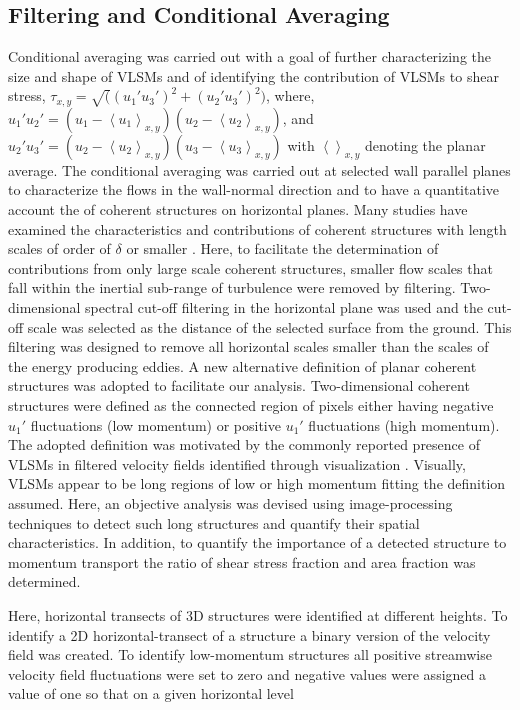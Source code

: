 \documentclass{svjour3}                     %
\begin{document}
\subsection{Filtering and Conditional Averaging}
Conditional averaging was carried out with a goal of further characterizing the size and shape of VLSMs and of identifying the contribution of VLSMs to shear stress, $\tau_{x,y} = \sqrt((u_{1}'u_{3}')^2+(u_{2}'u_{3}')^2)$, where, $u_{1}'u_{2}'= (u_{1} -\left< u_{1}\right >_{x,y})(u_{2} -\left< u_{2}\right >_{x,y})$, and $u_{2}'u_{3}'= (u_2 -\left< u_{2}\right >_{x,y})(u_{3} -\left< u_{3}\right >_{x,y})$ with $\left < \right >_{x,y}$ denoting the planar average. The conditional averaging was carried out at selected wall parallel planes to characterize the flows in the wall-normal direction and to have a quantitative account the of coherent structures on horizontal planes. Many studies have examined  the characteristics and contributions of coherent structures with length scales of order of $\delta$ or smaller \citep{}. Here, to facilitate the determination of contributions from only large scale coherent structures, smaller flow scales that  fall within the inertial sub-range of turbulence were removed by filtering.  Two-dimensional spectral cut-off filtering in the horizontal plane was used and the cut-off scale was selected as the distance of the selected surface from the ground. This filtering was designed to remove all horizontal scales smaller than the scales  of the energy producing eddies.  A new alternative definition of planar coherent structures was adopted to facilitate our analysis. Two-dimensional coherent structures were defined as the connected region of pixels either having negative $u_{1}'$ fluctuations (low momentum) or positive $u_{1}'$ fluctuations (high momentum). The adopted definition was motivated by the commonly reported presence of VLSMs in filtered velocity fields identified through visualization \citep{hutchins_marusic_jfm2007,dennis_nickels_jfm2011}.  Visually, VLSMs appear to be long regions of low or high momentum fitting the definition assumed.  Here, an objective analysis was devised using image-processing techniques to detect such long structures and quantify their spatial characteristics. In addition, to quantify the importance of a detected structure to momentum transport the ratio of shear stress fraction and area fraction was determined.  

Here, horizontal transects of 3D structures were identified at different heights. To identify a 2D horizontal-transect of a structure a binary version of the velocity field was created. To identify low-momentum structures all positive streamwise velocity field fluctuations were set to zero and negative values were assigned a value of one so that on a given horizontal level 
\end{document}
